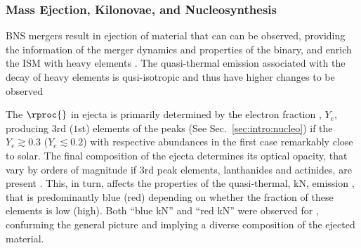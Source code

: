 

\subsubsection{Mass Ejection, Kilonovae, and Nucleosynthesis}

\ac{BNS} mergers result in ejection of material that can can be observed, providing the 
information of the merger dynamics and properties of the binary, and enrich the 
\ac{ISM} with heavy \rproc{} elements \cite{26}. The quasi-thermal emission associated with 
the decay of heavy \rproc{} elements is qusi-isotropic and thus have higher changes to be 
observed \cite{25}

The $\rproc{}$ \nuc{} in ejecta is primarily determined by the electron fraction \cite{137}, $Y_e$, 
producing $3$rd ($1$st) elements of the \rproc{} peaks (See Sec.~\ref{sec:intro:nucleo}) 
if the $Y_e{\gtrsim}0.3$ ($Y_e{\lesssim}0.2$) with respective abundances in the first case 
remarkably close to solar. 
The final composition of the ejecta determines its optical opacity, that vary by orders of 
magnitude if $3$rd peak elements, lanthanides and actinides, are present \cite{138,139}.
This, in turn, affects the properties of the quasi-thermal, \ac{kN}, emission \cite{25}, that is 
predominantly blue (red) depending on whether the fraction of these elements is low (high).
Both ``blue \ac{kN}'' and ``red \ac{kN}'' were observed for \GW{}, confurming the general 
picture and implying a diverse composition of the ejected material.

